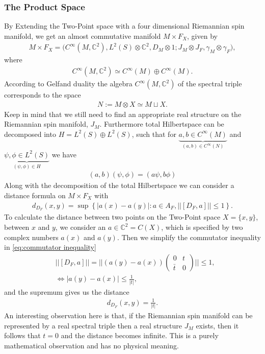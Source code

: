 \subsubsection{The Product Space}
By Extending the Two-Point space with a four dimensional Riemannian spin
manifold, we get an almost commutative manifold $M\times F_X$, given by
\begin{align}
    M\times F_X = \big(C^\infty(M, \mathbb{C}^2), L^2(S)\otimes \mathbb{C}^2,
    D_M\otimes 1 ; J_M\otimes J_F, \gamma_M \otimes \gamma_F\big),
\end{align}
where
\begin{align}
   C^\infty(M, \mathbb{C}^2) \simeq C^\infty(M) \oplus  C^\infty(M).
\end{align}
According to Gelfand duality the algebra $C^\infty(M, \mathbb{C}^2)$ of the
spectral triple corresponds to the space
\begin{align}
    N:= M\otimes X \simeq M\sqcup X.
\end{align}
Keep in mind that we still need to find an appropriate real structure on the
Riemannian spin manifold, $J_M$. Furthermore total Hilbertspace can be decomposed into $H = L^2(S) \oplus L^2(S)$, such that for
$\underbrace{a,b\in C^\infty(M)}_{(a, b) \in C^\infty(N)}$
and $\underbrace{\psi, \phi \in L^2(S)}_{(\psi, \phi) \in H}$ we have
\begin{align}
    (a, b)(\psi, \phi) = (a\psi, b\phi)
\end{align}
Along with the decomposition of the total Hilbertspace we can consider a
distance formula on $M\times F_X$ with
\begin{align}\label{eq:commutator inequality}
    d_{D_F}(x,y) = \sup\left\{  |a(x) - a(y)|:a\in A_F, ||[D_F, a]|| \leq
    1 \right\}.
\end{align}
To calculate the distance between two points on the Two-Point space $X= \{x,
y\}$, between $x$ and $y$, we consider an $a \in \mathbb{C}^2 = C(X)$, which is
specified by two complex numbers $a(x)$ and $a(y)$. Then we simplify the
commutator inequality in \ref{eq:commutator inequality}
\begin{align}
    &||[D_F , a]|| = ||(a(y) - a(x))\begin{pmatrix}0 &t\\\bar{t} &0
    \end{pmatrix}|| \leq 1,\\
    &\Leftrightarrow |a(y) - a(x)|\leq \frac{1}{|t|},
\end{align}
and the supremum gives us the distance
\begin{align}
    d_{D_F} (x,y) = \frac{1}{|t|}.
\end{align}
An interesting observation here is that, if the Riemannian spin manifold can be
represented by a real spectral triple then a real structure $J_M$ exists,
then it follows that $t=0$ and the distance becomes infinite. This is a
purely mathematical observation and has no physical meaning.

